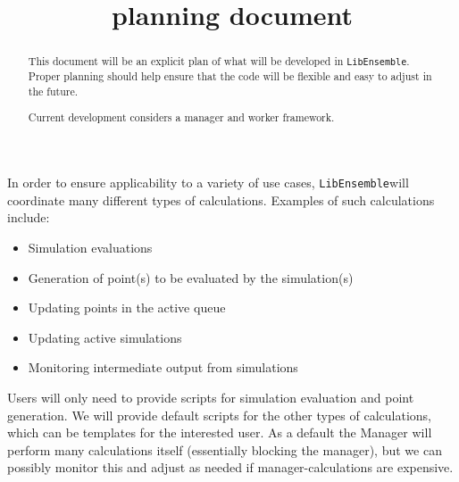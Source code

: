 \documentclass{article}
\title{\libE planning document}
\newcommand{\libE}{\texttt{LibEnsemble}}
\begin{document}
\maketitle
\begin{abstract}
  This document will be an explicit plan of what will be developed in
  \libE. Proper planning should help ensure that the code will be flexible
  and easy to adjust in the future.

  Current development considers a manager and worker framework. 
\end{abstract}

In order to ensure applicability to a variety of use cases, 
\libE will coordinate many different types of calculations. Examples of
such calculations include:
\begin{itemize}
  \item Simulation evaluations
  \item Generation of point(s) to be evaluated by the simulation(s)
  \item Updating points in the active queue
  \item Updating active simulations
  \item Monitoring intermediate output from simulations
\end{itemize}
Users will only need to provide scripts for simulation evaluation and point
generation. We will provide default scripts for the other types of calculations, 
which can be templates for the interested user. As a default the Manager will
perform many calculations itself (essentially blocking the manager), but we can
possibly monitor this and adjust as needed if manager-calculations are
expensive. 
\end{document}
